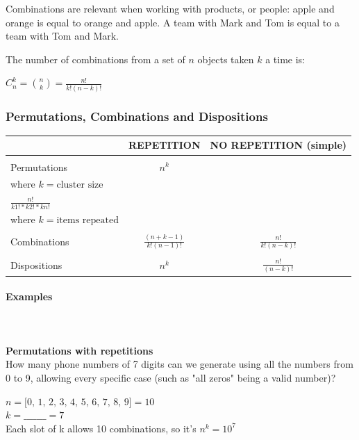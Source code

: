 \documentclass{article}
\begin{document}
Combinations are relevant when working with products, or people: apple and orange is equal to orange and apple. A team with Mark and Tom is equal to a team with Tom and Mark.

The number of combinations from a set of $n$ objects taken $k$ a time is:

$\displaystyle C _n ^k = \binom{n}{k} = \frac{n!}{k!(n - k)!}$

\subsubsection{Permutations, Combinations and Dispositions}
\begin{center}
\begin{tabular}{|m{2cm}|c|c|}
\hline
& REPETITION & NO REPETITION (simple) \\ \hline
&&\\[-1em]
Permutations & $\displaystyle n^k$ & \makecell{$\displaystyle \frac{n!}{(n - k)!}$ \\[15pt] where $k = \text{cluster size}$ \\[15pt] $\displaystyle \frac{n!}{k1! * k2! * kn!}$ \\[15pt] where $k = \text{items repeated}$} \\[50pt] \hline
&&\\[-1em]
Combinations & $\displaystyle \frac{(n + k - 1)}{k!(n - 1)!}$ & $\displaystyle \frac{n!}{k!(n - k)!}$ \\[25pt] \hline
&&\\[-1em]
Dispositions & $\displaystyle n^k$ & $\displaystyle \frac{n!}{(n - k)!}$ \\[25pt] 
\hline
\end{tabular}
\end{center}

\paragraph{Examples}\mbox{} \\
\mbox{} \\
\textbf{Permutations with repetitions} \\ 
How many phone numbers of 7 digits can we generate using all the numbers from 0 to 9, allowing every specific case (such as "all zeros" being a valid number)?

$n = \text{[0, 1, 2, 3, 4, 5, 6, 7, 8, 9]} = 10$ \\
$k = \_ \_ \_ \_ \_ \_ \_ = 7$ \\ 
Each slot of k allows 10 combinations, so it’s $n^k = 10^7$
\end{document}
